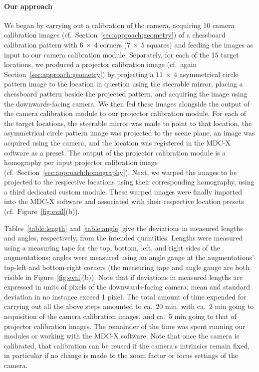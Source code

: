 \documentclass[review]{elsarticle}
\begin{document}
\paragraph{Our approach} We began by carrying out a calibration of the camera, acquiring 10 camera calibration images (cf.\ Section~\ref{sec:approach:geometry}) of a chessboard calibration pattern with $6~\times~4$ corners ($7~\times~5$ squares) and feeding the images as input to our camera calibration module. Separately, for each of the 15 target locations, we produced a projector calibration image (cf.\ again Section~\ref{sec:approach:geometry}) by projecting a $11~\times~4$ asymmetrical circle pattern image to the location in question using the steerable mirror, placing a chessboard pattern beside the projected pattern, and acquiring the image using the downwards-facing camera. We then fed these images alongside the output of the camera calibration module to our projector calibration module. For each of the target locations, the steerable mirror was made to point to that location, the asymmetrical circle pattern image was projected to the scene plane, an image was acquired using the camera, and the location was registered in the MDC-X software as a preset. The output of the projector calibration module is a homography per input projector calibration image (cf.\ Section~\ref{sec:approach:homography}). Next, we warped the images to be projected to the respective locations using their corresponding homography, using a third dedicated custom module. These warped images were finally imported into the MDC-X software and associated with their respective location presets (cf.\ Figure~\ref{fig:eval}(b)).

Tables~\ref{table:length} and \ref{table:angle} give the deviations in measured lengths and angles, respectively, from the intended quantities. Lengths were measured using a measuring tape for the top, bottom, left, and right sides of the augmentations; angles were measured using an angle gauge at the augmentations' top-left and bottom-right corners (the measuring tape and angle gauge are both visible in Figure~\ref{fig:eval}(b)). Note that if deviations in measured lengths are expressed in units of pixels of the downwards-facing camera, mean and standard deviation in no instance exceed 1 pixel. The total amount of time expended for carrying out all the above steps amounted to ca.\ 20 min, with ca.\ 2 min going to acquisition of the camera calibration images, and ca.\ 5 min going to that of projector calibration images. The remainder of the time was spent running our modules or working with the MDC-X software. Note that once the camera is calibrated, that calibration can be reused if the camera's intrinsics remain fixed, in particular if no change is made to the zoom factor or focus settings of the camera.
\end{document}
